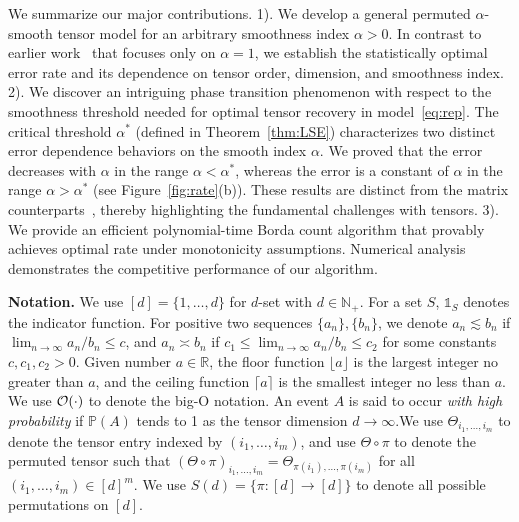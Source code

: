\documentclass{article}
\theoremstyle{definition}
\begin{document}
We summarize our major contributions.
1). We develop a general permuted $\alpha$-smooth tensor model for an arbitrary smoothness index $\alpha>0$. In contrast to earlier work~\cite{balasubramanian2021nonparametric,li2019nearest} that focuses only on $\alpha=1$, we establish the statistically optimal error rate and its dependence on tensor order, dimension, and smoothness index. 
2). We discover an intriguing phase transition phenomenon with respect to the smoothness threshold needed for optimal tensor recovery in model~\eqref{eq:rep}. The critical threshold $\alpha^*$ (defined in Theorem~\ref{thm:LSE}) characterizes two distinct error dependence behaviors on the smooth index $\alpha$. We proved that the error decreases with $\alpha$ in the range $\alpha<\alpha^*$, whereas the error is a constant of $\alpha$ in the range $\alpha>\alpha^*$ (see Figure~\ref{fig:rate}(b)).
These results are distinct from the matrix counterparts~\citep{gao2016optimal,klopp2017oracle,gao2018minimax}, thereby highlighting the fundamental challenges with tensors. 
3).  We provide an efficient polynomial-time Borda count algorithm that provably achieves optimal rate under monotonicity assumptions. Numerical analysis demonstrates the competitive performance of our algorithm.



{\bf Notation.} We use $[d]=\{1,\ldots,d\}$ for $d$-set with $d\in\mathbb{N}_{+}$. For a set $S$, $\mathds{1}_S$ denotes the indicator function. For positive two sequences $\{a_n\},\{b_n\}$,  we denote $a_n\lesssim b_n$ if $\lim_{n\to\infty} a_n/b_n\leq c$,  and $a_n\asymp b_n$ if $c_1\leq \lim_{n\to \infty} a_n/b_n\leq c_2$ for some constants $c,c_1,c_2>0$. Given number $a\in\mathbb{R}$, the floor function $\lfloor a\rfloor$ is the largest integer no greater than $a$, and the ceiling function $\lceil a\rceil$ is the smallest integer no less than $a$.
We use $\mathcal{O}(\cdot)$ to denote the big-O notation.  An event $A$ is said to occur \emph{with high probability} if $\mathbb{P}(A)$ tends to 1 as the tensor dimension $d\to\infty$.We use $\Theta_{i_1,\ldots,i_m}$ to denote the tensor entry indexed by $(i_1,\ldots,i_m)$, and use $\Theta\circ\pi$ to denote the permuted tensor such that $(\Theta\circ\pi)_{i_1,\ldots,i_m} = \Theta_{\pi(i_1),\ldots,\pi(i_m)}$ for all $(i_1,\ldots,i_m)\in[d]^m$. We use $S(d)=\{\pi\colon [d]\to[d]\}$ to denote all possible permutations on $[d]$.
\vspace{-.3cm}
\end{document}

